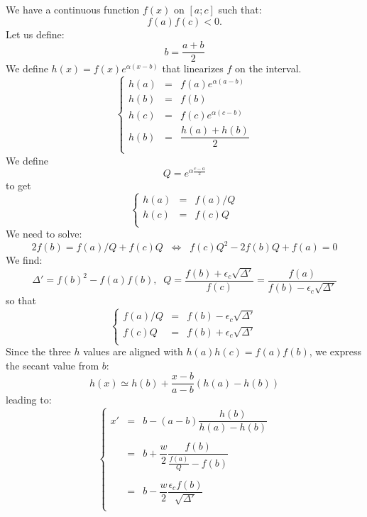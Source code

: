 \documentclass[aps,12pt]{revtex4}
\begin{document}
We have a continuous function $f(x)$ on $[a;c]$ such that:
 $$f(a)f(c)<0.$$
Let us define:
$$
	b = \dfrac{a+b}{2}
$$
We define $h(x)=f(x)e^{\alpha(x-b)}$ that linearizes $f$ on the interval.
$$
\left\lbrace
\begin{array}{rcl}
	h(a) & = & f(a)e^{\alpha(a-b)}\\
	h(b) & = & f(b)\\
	h(c) & = & f(c) e^{\alpha(c-b)}\\
	h(b) & = & \dfrac{h(a)+h(b)}{2}\\
\end{array}
\right.
$$
We define
$$
Q = e^{\alpha\frac{c-a}{2}}
$$
to get
$$	
\left\lbrace
\begin{array}{rcl}
	h(a) & = & f(a)/Q\\
 	h(c) & = & f(c)Q\\
\end{array}
\right.
$$
We need to solve:
$$
	2f(b) = f(a)/Q+f(c)Q \;\; \Leftrightarrow \;\; f(c)Q^2 - 2 f(b) Q + f(a) = 0
$$
We find:
$$
	\Delta' = f(b)^2 - f(a)f(b), \;\; Q = \dfrac{f(b)+\epsilon_c \sqrt{\Delta'}}{f(c)} = \dfrac{f(a)}{f(b)-\epsilon_c \sqrt{\Delta'}}
$$
so that
$$
\left\lbrace
\begin{array}{rcl}
	f(a)/Q & = & f(b) - \epsilon_c \sqrt{\Delta'}\\
	f(c) Q & = & f(b) + \epsilon_c \sqrt{\Delta'}\\
\end{array}
\right.
$$
Since the three $h$ values are aligned with $h(a)h(c)=f(a)f(b)$, we express the secant value from $b$:
$$
	h(x) \simeq h(b) + \dfrac{x-b}{a-b} \left( h(a) - h(b) \right)
$$
leading to:
$$
\left\lbrace
\begin{array}{rcl}
	x' & = & b - (a-b) \dfrac{h(b)}{h(a)-h(b)} \\
	\\
	& = & b + \dfrac{w}{2} \dfrac{f(b)}{\frac{f(a)}{Q}-f(b)}\\
	\\
	& = & b - \dfrac{w}{2} \dfrac{\epsilon_c f(b)}{\sqrt{\Delta'}}\\
\end{array}
\right.
$$
\end{document}
